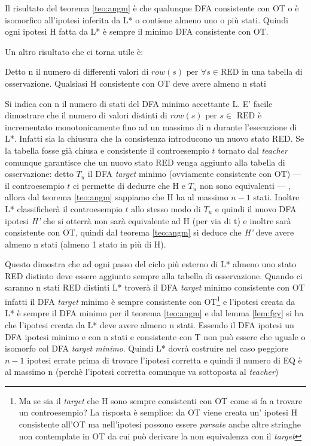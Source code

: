 Il risultato del teorema \ref{teo:angm} è che qualunque DFA consistente con OT o è isomorfico all'ipotesi inferita da L* o contiene almeno uno o più stati. Quindi ogni ipotesi \ac{H} fatta da L* è sempre il minimo DFA consistente con OT.

Un altro risultato che ci torna utile è:
\begin{lemma}
\label{lem:fgv}
Detto n il numero di differenti valori di $row(s) \text{ per } \forall s \in \text{RED}$ in una tabella di osservazione. Qualsiasi \ac{H} consistente con OT deve avere almeno n stati
\end{lemma}
Si indica con n il numero di stati del DFA minimo accettante \ac{L}. E' facile dimostrare che il numero di valori distinti di $row(s) \text{ per } s \in \text{ RED} $ è incrementato monotonicamente fino ad un massimo di n durante l'esecuzione di L*. Infatti sia la chiusura che la consistenza introducono un nuovo stato RED. Se la tabella fosse già chiusa e consistente il controesempio $t$ tornato dal \textit{teacher} comunque garantisce che un nuovo stato RED venga aggiunto alla tabella di osservazione: detto $T_u$ il DFA \textit{target} minimo (ovviamente consistente con OT) --- il controesempio $t$ ci permette di dedurre che \ac{H} e  $T_u$  non sono equivalenti ---  , allora dal teorema \ref{teo:angm} sappiamo che \ac{H} ha al massimo $n-1$ stati. Inoltre L* classificherà il controesempio $t$ allo stesso modo di $T_u$ e quindi il nuovo DFA ipotesi \textit{H'} che  si otterrà  non sarà equivalente ad \ac{H} (per via di t) e inoltre sarà consistente con OT, quindi dal teorema \ref{teo:angm}  si deduce che \textit{H'} deve avere almeno n stati (almeno 1 stato in più di \ac{H}).

Questo dimostra che ad ogni passo del ciclo più esterno di L* almeno uno stato RED distinto deve essere aggiunto sempre alla tabella di osservazione. Quando ci saranno n stati RED distinti L* troverà il DFA \textit{target} minimo consistente con OT infatti il DFA \textit{target} minimo è sempre consistente con OT\footnote{Ma se sia il \textit{target} che \ac{H} sono sempre consistenti con OT come si fa a trovare un controesempio? La risposta è semplice: da OT viene creata un' ipotesi \ac{H} consistente all'OT ma nell'ipotesi possono essere \textit{parsate} anche altre stringhe non contemplate in OT da cui può derivare la non equivalenza con il \textit{target}} e l'ipotesi creata da L* è sempre il DFA minimo per il teorema \ref{teo:angm} e dal lemma \ref{lem:fgv} si ha che l'ipotesi creata da L* deve avere almeno n stati.
Essendo il DFA ipotesi un DFA ipotesi minimo e con n stati e consistente con T non può essere che uguale o isomorfo col DFA \textit{target minimo}.  Quindi L* dovrà costruire nel caso peggiore $n-1$ ipotesi errate prima di trovare l'ipotesi corretta e quindi il numero di \ac{EQ} è al massimo n (perchè l'ipotesi corretta comunque va sottoposta al \textit{teacher})

